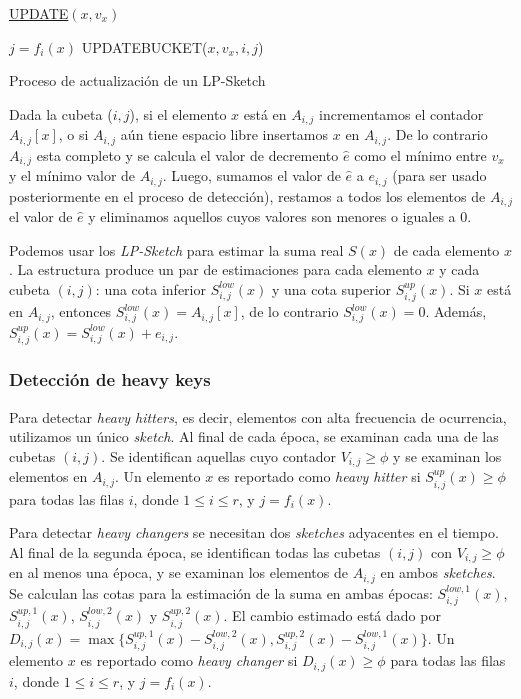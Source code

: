 \documentclass[a4paper,10pt, oneside]{article}
\begin{document}
\begin{algorithm}[ht]
	
	\underline{UPDATE}$(x, v_x)$\;
	
	{
		{
			$j = f_i(x)$\;
			UPDATEBUCKET($x, v_x, i, j$)
		}
	}
	
	\caption{Proceso de actualización de un LP-Sketch}
	\label{alg:lp-sketch}
\end{algorithm}

Dada la cubeta ($i,j$), si el elemento $x$ está en $A_{i,j}$ incrementamos el contador $A_{i,j}[x]$, o si $A_{i,j}$ aún tiene espacio libre insertamos $x$ en $A_{i,j}$. De lo contrario $A_{i,j}$ esta completo y se calcula el valor de decremento $\hat{e}$ como el mínimo entre $v_x$ y el mínimo valor de $A_{i,j}$. Luego, sumamos el valor de $\hat{e}$ a $e_{i,j}$ (para ser usado posteriormente en el proceso de detección), restamos a todos los elementos de $A_{i,j}$ el valor de $\hat{e}$ y eliminamos aquellos cuyos valores son menores o iguales a $0$.

Podemos usar los \textit{LP-Sketch} para estimar la suma real $S(x)$ de cada elemento $x$. La estructura produce un par de estimaciones para cada elemento $x$ y cada cubeta $(i,j)$: una cota inferior $S_{i,j}^{low}(x)$ y una cota superior $S_{i,j}^{up}(x)$. Si $x$ está en $A_{i,j}$, entonces $S_{i,j}^{low}(x) = A_{i,j}[x]$, de lo contrario $S_{i,j}^{low}(x) = 0$. Además, $S_{i,j}^{up}(x) = S_{i,j}^{low}(x) + e_{i,j}$.

\subsubsection{Detección de heavy keys}
Para detectar \textit{heavy hitters}, es decir, elementos con alta frecuencia de ocurrencia, utilizamos un único \textit{sketch}. Al final de cada época, se examinan cada una de las cubetas $(i,j)$. Se identifican aquellas cuyo contador $V_{i,j} \geq \phi$ y se examinan los elementos en $A_{i,j}$. Un elemento $x$ es reportado como \textit{heavy hitter} si $S_{i,j}^{up}(x) \geq \phi$ para todas las filas $i$, donde $1 \leq i \leq r$, y $j = f_i(x)$.

Para detectar \textit{heavy changers} se necesitan dos \textit{sketches} adyacentes en el tiempo. Al final de la segunda época, se identifican todas las cubetas $(i,j)$ con $V_{i,j} \geq \phi$ en al menos una época, y se examinan los elementos de $A_{i,j}$ en ambos \textit{sketches}. Se calculan las cotas para la estimación de la suma en ambas épocas: $S_{i,j}^{low,1}(x)$, $S_{i,j}^{up,1}(x)$, $S_{i,j}^{low,2}(x)$ y $S_{i,j}^{up,2}(x)$. El cambio estimado está dado por $D_{i,j}(x) = \max\{S_{i,j}^{up,1}(x) - S_{i,j}^{low,2}(x), S_{i,j}^{up,2}(x) - S_{i,j}^{low,1}(x)\}$. Un elemento $x$ es reportado como \textit{heavy changer} si $D_{i,j}(x) \geq \phi$ para todas las filas $i$, donde $1 \leq i \leq r$, y $j = f_i(x)$.
\end{document}
